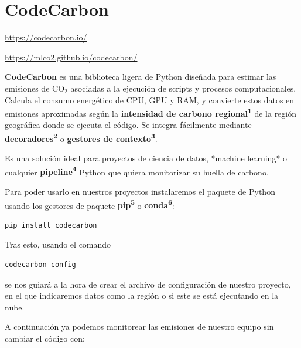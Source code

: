 \documentclass[12pt,a4paper]{report}
\begin{document}
\section*{\textbf{CodeCarbon}}

\url{https://codecarbon.io/}

\url{https://mlco2.github.io/codecarbon/}

\textbf{CodeCarbon} es una biblioteca ligera de Python diseñada para estimar las emisiones de CO$_2$ asociadas a la ejecución de scripts y procesos computacionales. Calcula el consumo energético de CPU, GPU y RAM, y convierte estos datos en emisiones aproximadas según la \textbf{intensidad de carbono regional\textsuperscript{1}} de la región geográfica donde se ejecuta el código. Se integra fácilmente mediante \textbf{decoradores\textsuperscript{2}} o \textbf{gestores de contexto\textsuperscript{3}}.

Es una solución ideal para proyectos de ciencia de datos, *machine learning* o cualquier \textbf{pipeline\textsuperscript{4}} Python que quiera monitorizar su huella de carbono.

Para poder usarlo en nuestros proyectos instalaremos el paquete de Python usando los gestores de paquete \textbf{pip\textsuperscript{5}} o \textbf{conda\textsuperscript{6}}:

\begin{tcolorbox}[colback=codebackground, colframe=codeborder, boxrule=0.8pt, arc=0mm, boxsep=5pt, left=5pt, right=5pt, top=5pt, bottom=5pt]
  \begin{lstlisting}[language=bash]
    pip install codecarbon
  \end{lstlisting}
\end{tcolorbox}

Tras esto, usando el comando

\begin{tcolorbox}[colback=codebackground, colframe=codeborder, boxrule=0.8pt, arc=0mm, boxsep=5pt, left=5pt, right=5pt, top=5pt, bottom=5pt]
  \begin{lstlisting}[language=bash]
    codecarbon config
  \end{lstlisting}
\end{tcolorbox}

se nos guiará a la hora de crear el archivo de configuración de nuestro proyecto, en el que indicaremos datos como la región o si este se está ejecutando en la nube.

A continuación ya podemos monitorear las emisiones de nuestro equipo sin cambiar el código con:
\end{document}

